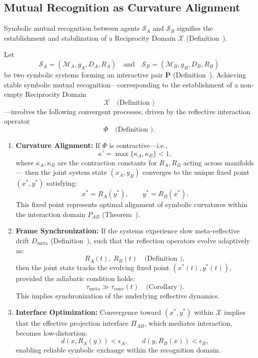 \subsection{Mutual Recognition as Curvature Alignment}
\label{subsec:bk9_mutual_recognition_as_curvature_alignment}
Symbolic mutual recognition between agents $\mathcal{S}_A$ and $\mathcal{S}_B$ signifies the establishment and stabilization of a Reciprocity Domain $\mathcal{X}$ (Definition~). %
\begin{proposition}
\label{prop:bk9__mechanisms_of_recognition}
Let
\[
\mathcal{S}_A = (\mathcal{M}_A, g_A, D_A, R_A)
\quad \text{and} \quad
\mathcal{S}_B = (\mathcal{M}_B, g_B, D_B, R_B)
\]
be two symbolic systems forming an interactive pair \( \mathbf{P} \) (Definition~).
Achieving stable symbolic mutual recognition—corresponding to the establishment of a non-empty Reciprocity Domain 
\[
\mathcal{X} \quad \text{(Definition~)}
\]
—involves the following convergent processes, driven by the reflective interaction operator 
\[
\Phi \quad \text{(Definition~)}.
\]
\begin{enumerate}
    \item \textbf{Curvature Alignment:}  
    If \( \Phi \) is contractive—i.e.,  
    \[
    \kappa' = \max\{\kappa_A, \kappa_B\} < 1,
    \]
    where \( \kappa_A, \kappa_B \) are the contraction constants for \( R_A, R_B \) acting across manifolds—
    then the joint system state \( (x_A, y_B) \) converges to the unique fixed point \( (x^*, y^*) \) satisfying:
    \[
    x^* = R_A(y^*), \qquad y^* = R_B(x^*).
    \]
    This fixed point represents optimal alignment of symbolic curvatures within the interaction domain \( P_{AB} \)
    (Theorem~).
    \item \textbf{Frame Synchronization:}  
    If the systems experience slow meta-reflective drift \( D_{\text{meta}} \) (Definition~), 
    such that the reflection operators evolve adaptively as:
    \[
    R_A(t),\ R_B(t) \quad \text{(Definition~)},
    \]
    then the joint state tracks the evolving fixed point \( (x^*(t), y^*(t)) \),
    provided the adiabatic condition holds:
    \[
    \tau_{\text{meta}} \gg \tau_{\text{conv}}(t)
    \quad \text{(Corollary~)}.
    \]
    This implies synchronization of the underlying reflective dynamics.
    \item \textbf{Interface Optimization:}  
    Convergence toward \( (x^*, y^*) \) within \( \mathcal{X} \) implies that the effective projection interface 
    \( \Pi_{AB} \), which mediates interaction, becomes low-distortion:
    \[
    d(x, R_A(y)) < \epsilon_A, \qquad d(y, R_B(x)) < \epsilon_B,
    \]
    enabling reliable symbolic exchange within the recognition domain.
\end{enumerate}
\end{proposition}

